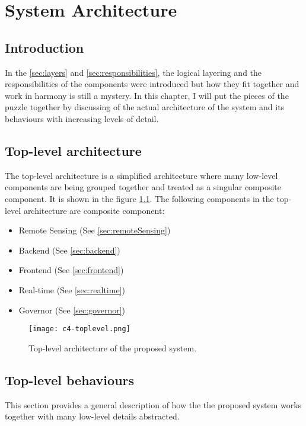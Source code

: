 \documentclass[../thesis.tex]{subfiles}
\begin{document}
\chapter{System Architecture}

\section{Introduction}

In the \autoref{sec:layers} and \autoref{sec:responsibilities}, the logical layering and the responsibilities of the components were introduced but how they fit together and work in harmony is still a mystery. In this chapter, I will put the pieces of the puzzle together by discussing of the actual architecture of the system and its behaviours with increasing levels of detail. 


\section{Top-level architecture}

The top-level architecture is a simplified architecture where many low-level components are being grouped together and treated as a singular composite component. It is shown in the figure \ref{fig:toplevel}. The following components in the top-level architecture are composite component:

\begin{itemize}
	\item Remote Sensing (See \autoref{sec:remoteSensing})
	\item Backend (See \autoref{sec:backend})
	\item Frontend (See \autoref{sec:frontend})
	\item Real-time (See \autoref{sec:realtime})
	\item Governor (See \autoref{sec:governor})
\end{itemize}


\begin{figure}[!ht]
	\centering
	\texttt{[image: c4-toplevel.png]}
	\caption{Top-level architecture of the proposed system.}
	\label{fig:toplevel}
\end{figure}

\section{Top-level behaviours}

This section provides a general description of how the the proposed system works together with many low-level details abstracted. 
\end{document}
